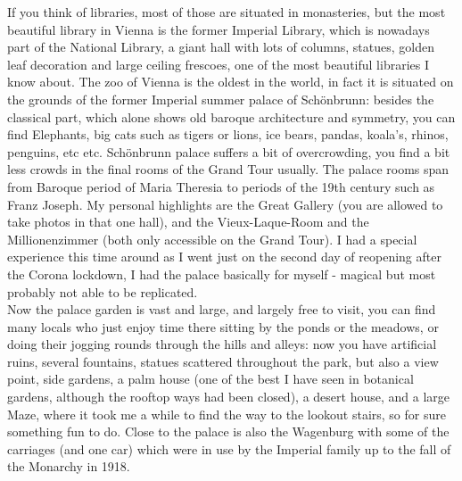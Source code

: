If you think of libraries, most of those are situated in monasteries, but the most beautiful library in Vienna is the former Imperial Library, which is nowadays part of the National Library, a giant hall with lots of columns, statues, golden leaf decoration and large ceiling frescoes, one of the most beautiful libraries I know about. The zoo of Vienna is the oldest in the world, in fact it is situated on the grounds of the former Imperial summer palace of Sch\"onbrunn: besides the classical part, which alone shows old baroque architecture and symmetry, you can find Elephants, big cats such as tigers or lions, ice bears, pandas, koala's, rhinos, penguins, etc etc. Sch\"onbrunn palace suffers a bit of overcrowding, you find a bit less crowds in the final rooms of the Grand Tour usually. The palace rooms span from Baroque period of Maria Theresia to periods of the 19th century such as Franz Joseph. My personal highlights are the Great Gallery (you are allowed to take photos in that one hall), and the Vieux-Laque-Room and the Millionenzimmer (both only accessible on the Grand Tour). I had a special experience this time around as I went just on the second day of reopening after the Corona lockdown, I had the palace basically for myself - magical but most probably not able to be replicated.\\
Now the palace garden is vast and large, and largely free to visit, you can find many locals who just enjoy time there sitting by the ponds or the meadows, or doing their jogging rounds through the hills and alleys: now you have artificial ruins, several fountains, statues scattered throughout the park, but also a view point, side gardens, a palm house (one of the best I have seen in botanical gardens, although the rooftop ways had been closed), a desert house, and a large Maze, where it took me a while to find the way to the lookout stairs, so for sure something fun to do. Close to the palace is also the Wagenburg with some of the carriages (and one car) which were in use by the Imperial family up to the fall of the Monarchy in 1918.\\


